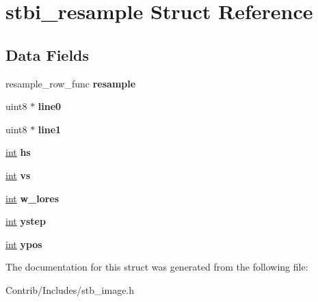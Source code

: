 \hypertarget{structstbi__resample}{}\section{stbi\+\_\+resample Struct Reference}
\label{structstbi__resample}
\subsection*{Data Fields}
\begin{DoxyCompactItemize}
\item 
resample\+\_\+row\+\_\+func {\bfseries resample}\hypertarget{structstbi__resample_aad674d882d14ed5be8b4aa20ff24f26d}{}\label{structstbi__resample_aad674d882d14ed5be8b4aa20ff24f26d}

\item 
uint8 $\ast$ {\bfseries line0}\hypertarget{structstbi__resample_a61a35c76e93f2347cff2d7e2e033b477}{}\label{structstbi__resample_a61a35c76e93f2347cff2d7e2e033b477}

\item 
uint8 $\ast$ {\bfseries line1}\hypertarget{structstbi__resample_ad36eb4e9c852215fee2a99d63b3350fe}{}\label{structstbi__resample_ad36eb4e9c852215fee2a99d63b3350fe}

\item 
\hyperlink{_s_d_l__thread_8h_a6a64f9be4433e4de6e2f2f548cf3c08e}{int} {\bfseries hs}\hypertarget{structstbi__resample_a4a927fdededfcca5efd8da6d3c0c4170}{}\label{structstbi__resample_a4a927fdededfcca5efd8da6d3c0c4170}

\item 
\hyperlink{_s_d_l__thread_8h_a6a64f9be4433e4de6e2f2f548cf3c08e}{int} {\bfseries vs}\hypertarget{structstbi__resample_a6977d303d54aa4c4e362cd314a9b4902}{}\label{structstbi__resample_a6977d303d54aa4c4e362cd314a9b4902}

\item 
\hyperlink{_s_d_l__thread_8h_a6a64f9be4433e4de6e2f2f548cf3c08e}{int} {\bfseries w\+\_\+lores}\hypertarget{structstbi__resample_ab7d5018195a3ff279cd25e076a1ff4b3}{}\label{structstbi__resample_ab7d5018195a3ff279cd25e076a1ff4b3}

\item 
\hyperlink{_s_d_l__thread_8h_a6a64f9be4433e4de6e2f2f548cf3c08e}{int} {\bfseries ystep}\hypertarget{structstbi__resample_afc697a55980392e3a8585feca3fd0d3f}{}\label{structstbi__resample_afc697a55980392e3a8585feca3fd0d3f}

\item 
\hyperlink{_s_d_l__thread_8h_a6a64f9be4433e4de6e2f2f548cf3c08e}{int} {\bfseries ypos}\hypertarget{structstbi__resample_a4db09a4236b6f591c377857b932eb41a}{}\label{structstbi__resample_a4db09a4236b6f591c377857b932eb41a}

\end{DoxyCompactItemize}


The documentation for this struct was generated from the following file\+:\begin{DoxyCompactItemize}
\item 
Contrib/\+Includes/stb\+\_\+image.\+h\end{DoxyCompactItemize}
